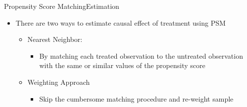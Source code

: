 \documentclass[hyperref={pdfpagelabels=false}]{beamer}
\begin{document}
\begin{frame}{}
\titlepage
\end{frame}








\begin{frame}{Propensity Score Matching}{Estimation}
	\begin{itemize}
		\item There are two ways to estimate causal effect of treatment using PSM
			\vspace{0.2cm}
			\begin{itemize}	
		\item[1] Nearest Neighbor: 
		
			\begin{itemize}
							\vspace{0.2cm}
		\item By matching each treated observation to the untreated observation with the same or similar values of the propensity score
					\end{itemize}
					\vspace{0.2cm}
		\item[2] Weighting Approach
		\begin{itemize}
			\vspace{0.2cm}
			\item Skip the cumbersome matching procedure and re-weight sample
		\end{itemize}
				
			\end{itemize}
		
	\end{itemize}
\end{frame}
\end{document}
